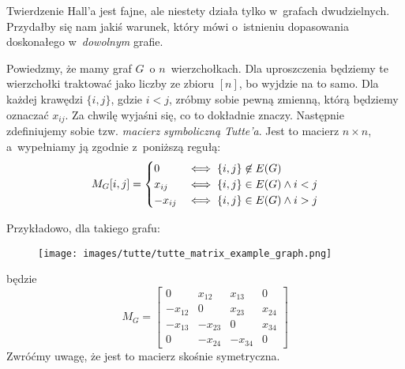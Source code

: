     Twierdzenie Hall'a jest fajne, ale niestety działa tylko w~grafach dwudzielnych. Przydałby się nam jakiś warunek, który mówi o~istnieniu dopasowania doskonałego w~\emph{dowolnym} grafie.
    
    Powiedzmy, że mamy graf $G$~o $n$~wierzchołkach. Dla uproszczenia będziemy te wierzchołki traktować jako liczby ze zbioru $[n]$, bo wyjdzie na to samo. Dla każdej krawędzi $\{i, j\}$, gdzie $i < j$, zróbmy sobie pewną zmienną, którą będziemy oznaczać $x_{ij}$. Za chwilę wyjaśni się, co to dokładnie znaczy. Następnie zdefiniujemy sobie tzw. \emph{macierz symboliczną Tutte'a}. Jest to macierz $n \times n$, a~wypełniamy ją zgodnie z~poniższą regułą:
    \begin{equation*}
        M_G[i, j] = \begin{cases}
            0 & \iff \{i, j\} \not\in E\pars{G}\\
            x_{ij} & \iff \{i, j\} \in E\pars{G} \land i < j\\
            -x_{ij} & \iff \{i, j\} \in E\pars{G} \land i > j
        \end{cases}
    \end{equation*}

    Przykładowo, dla takiego grafu:
    \begin{figure}[H]
        \centering
        \texttt{[image: images/tutte/tutte\_matrix\_example\_graph.png]}
    \end{figure}
    
    będzie
    \begin{equation*}
        M_G = \begin{bmatrix}
            0 & x_{12} & x_{13} & 0\\
            -x_{12} & 0 & x_{23} & x_{24}\\
            -x_{13} & -x_{23} & 0 & x_{34}\\
            0 & -x_{24} & -x_{34} & 0
        \end{bmatrix}
    \end{equation*}
    Zwróćmy uwagę, że jest to macierz skośnie symetryczna.
    
